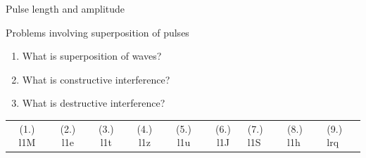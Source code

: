 \begin{Investigation}{Pulse length and amplitude }
\begin{exercises}{ Problems involving superposition of pulses }
\begin{enumerate}[noitemsep, label=\textbf{\arabic*}. ]
\begin{figure}[H]
 \end{figure}               \label{m38802*uid62}\item 
          What is superposition of waves?\newline
\label{m38802*uid64}\item What is constructive interference?\newline
\label{m38802*uid65}\item What is destructive interference?\newline
        \end{enumerate}
  \label{m38802*eip-812}
\par \practiceinfo
 \par \begin{tabular}[h]{cccccc}
 (1.) l1M  &  (2.) l1e  &  (3.) l1t  &  (4.) l1z  &  (5.) l1u  &  (6.) l1J  &  (7.) l1S  &  (8.) l1h  &  (9.) lrq  & \end{tabular}


\end{exercises}
\end{Investigation}
